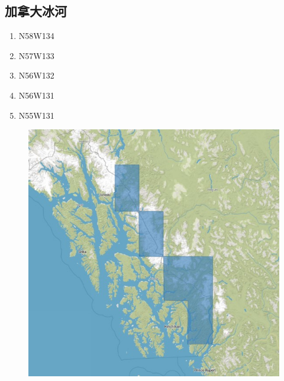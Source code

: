 \documentclass[a4paper, 12pt]{article}
\begin{document}
\begin{appendices}
    \subsection{加拿大冰河}
    \begin{multicols}{3}
        \begin{enumerate}
            \item N58W134
            \item N57W133
            \item N56W132
            \item N56W131
            \item N55W131
        \end{enumerate}
    \end{multicols}
    \begin{figure}[H]
        \centering
        \includegraphics[width=0.8\linewidth]{fig/a5.jpg}
    \end{figure}
\end{appendices}
\end{document}
